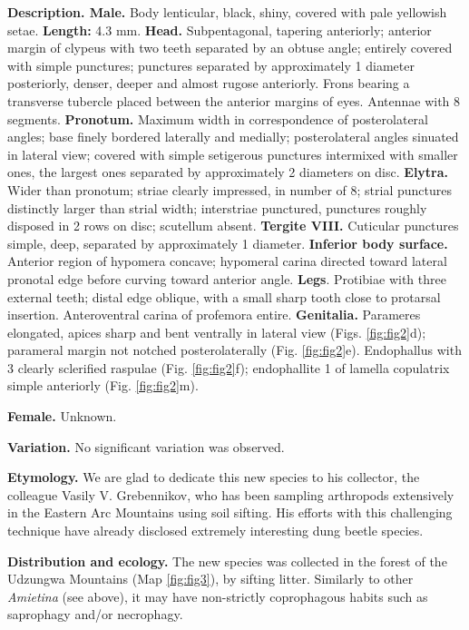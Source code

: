 \documentclass[fleqn,10pt,lineno]{wlpeerj}
\begin{document}
\textbf{Description. Male.} Body lenticular, black, shiny, covered with pale yellowish setae. \textbf{Length:} 4.3 mm. \textbf{Head.} Subpentagonal, tapering anteriorly; anterior margin of clypeus with two teeth separated by an obtuse angle; entirely covered with simple punctures; punctures separated by approximately 1 diameter posteriorly, denser, deeper and almost rugose anteriorly. Frons bearing a transverse tubercle placed between the anterior margins of eyes. Antennae with 8 segments. \textbf{Pronotum.} Maximum width in correspondence of posterolateral angles; base finely bordered laterally and medially; posterolateral angles sinuated in lateral view; covered with simple setigerous punctures intermixed with smaller ones, the largest ones separated by approximately 2 diameters on disc. \textbf{Elytra.} Wider than pronotum; striae clearly impressed, in number of 8; strial punctures distinctly larger than strial width; interstriae punctured, punctures roughly disposed in 2 rows on disc; scutellum absent. \textbf{Tergite VIII.} Cuticular punctures simple, deep, separated by approximately 1 diameter.  \textbf{Inferior body surface.} Anterior region of hypomera concave; hypomeral carina directed toward lateral pronotal edge before curving toward anterior angle. \textbf{Legs}. Protibiae with three external teeth; distal edge oblique, with a small sharp tooth close to protarsal insertion. Anteroventral carina of profemora entire. \textbf{Genitalia.} Parameres elongated, apices sharp and bent ventrally in lateral view (Figs. \ref{fig:fig2}d); parameral margin not notched posterolaterally (Fig. \ref{fig:fig2}e). Endophallus with 3 clearly sclerified raspulae (Fig. \ref{fig:fig2}f); endophallite 1 of lamella copulatrix simple anteriorly (Fig. \ref{fig:fig2}m).

\textbf{Female.} Unknown.

\textbf{Variation.} No significant variation was observed.

\textbf{Etymology.} We are glad to dedicate this new species to his collector, the colleague Vasily V. Grebennikov, who has been sampling arthropods extensively in the Eastern Arc Mountains using soil sifting. His efforts with this challenging technique have already disclosed extremely interesting dung beetle species.

\textbf{Distribution and ecology.} The new species was collected in the forest of the Udzungwa Mountains (Map \ref{fig:fig3}), by sifting litter. Similarly to other \textit{Amietina} (see above), it may have non-strictly coprophagous habits such as saprophagy and/or necrophagy.
\end{document}
